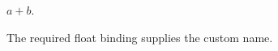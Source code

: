 \documentclass{article}
\begin{document}
\begin{figure}
$a+b$. \caption{The required float binding supplies the custom name.}
\end{figure}
\end{document}

